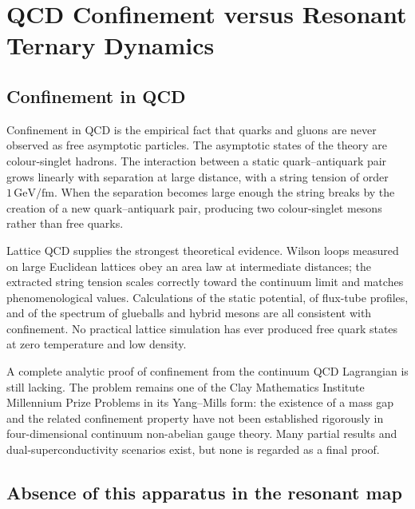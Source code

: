 
\chapter{QCD Confinement versus Resonant Ternary Dynamics}
\label{ch:qcd-vs-resonant}

\section{Confinement in QCD}

Confinement in QCD is the empirical fact that quarks and gluons are never
observed as free asymptotic particles. The asymptotic states of the theory are
colour-singlet hadrons. The interaction between a static quark--antiquark pair
grows linearly with separation at large distance, with a string tension of
order \(1\,\mathrm{GeV/fm}\). When the separation becomes large enough the
string breaks by the creation of a new quark--antiquark pair, producing two
colour-singlet mesons rather than free quarks.

Lattice QCD supplies the strongest theoretical evidence. Wilson loops measured
on large Euclidean lattices obey an area law at intermediate distances; the
extracted string tension scales correctly toward the continuum limit and matches
phenomenological values. Calculations of the static potential, of flux-tube
profiles, and of the spectrum of glueballs and hybrid mesons are all consistent
with confinement. No practical lattice simulation has ever produced free quark
states at zero temperature and low density.

A complete analytic proof of confinement from the continuum QCD Lagrangian is
still lacking. The problem remains one of the Clay Mathematics Institute
Millennium Prize Problems in its Yang--Mills form: the existence of a mass gap
and the related confinement property have not been established rigorously in
four-dimensional continuum non-abelian gauge theory. Many partial results and
dual-superconductivity scenarios exist, but none is regarded as a final proof.

\section{Absence of this apparatus in the resonant map}

